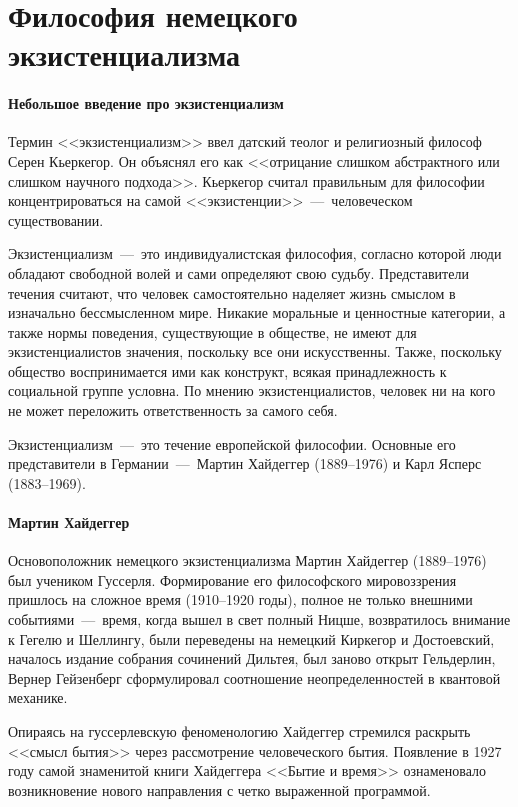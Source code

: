 \documentclass{bmstu}
\begin{document}
\chapter*{Философия немецкого экзистенциализма}

\subsubsection*{Небольшое введение про экзистенциализм}

Термин <<экзистенциализм>> ввел датский теолог и религиозный философ Серен Кьеркегор. Он объяснял его как <<отрицание слишком абстрактного или слишком научного подхода>>. Кьеркегор считал правильным для философии концентрироваться на самой <<экзистенции>>~---~человеческом существовании.

Экзистенциализм~---~это индивидуалистская философия, согласно которой люди обладают свободной волей и сами определяют свою судьбу. Представители течения считают, что человек самостоятельно наделяет жизнь смыслом в изначально бессмысленном мире. Никакие моральные и ценностные категории, а также нормы поведения, существующие в обществе, не имеют для экзистенциалистов значения, поскольку все они искусственны. Также, поскольку общество воспринимается ими как конструкт, всякая принадлежность к социальной группе условна. По мнению экзистенциалистов, человек ни на кого не может переложить ответственность за самого себя.

Экзистенциализм~---~это течение европейской философии. Основные его представители в Германии~---~Мартин Хайдеггер (1889–1976) и Карл Ясперс (1883–1969).

\subsubsection*{Мартин Хайдеггер}

Основоположник немецкого экзистенциализма Мартин Хайдеггер (1889–1976) был учеником Гуссерля. Формирование его философского мировоззрения пришлось на сложное время (1910–1920 годы), полное не только внешними событиями~---~время, когда вышел в свет полный Ницше, возвратилось внимание к Гегелю и Шеллингу, были переведены на немецкий Киркегор и Достоевский, началось издание собрания сочинений Дильтея, был заново открыт Гельдерлин, Вернер Гейзенберг сформулировал соотношение неопределенностей в квантовой механике.

Опираясь на гуссерлевскую феноменологию Хайдеггер стремился раскрыть <<смысл бытия>> через рассмотрение человеческого бытия. Появление в 1927 году самой знаменитой книги Хайдеггера <<Бытие и время>> ознаменовало возникновение нового направления с четко выраженной программой.
\end{document}
